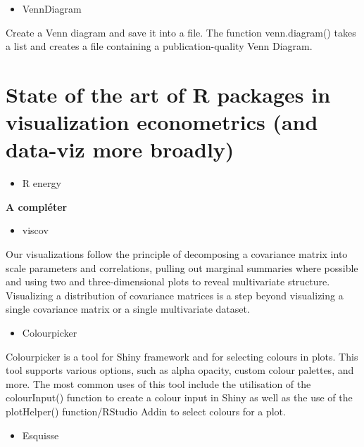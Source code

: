 \documentclass[
]{report}
\providecommand{\tightlist}{%
  \setlength{\itemsep}{0pt}\setlength{\parskip}{0pt}}
\begin{document}
\begin{itemize}
\tightlist
\item
  VennDiagram
\end{itemize}

Create a Venn diagram and save it into a file. The function venn.diagram() takes a list and creates a file containing a publication-quality Venn Diagram.

\hypertarget{state-of-the-art-of-r-packages-in-visualization-econometrics-and-data-viz-more-broadly}{%
\chapter{State of the art of R packages in visualization econometrics (and data-viz more broadly)}\label{state-of-the-art-of-r-packages-in-visualization-econometrics-and-data-viz-more-broadly}}

\begin{itemize}
\tightlist
\item
  R energy
\end{itemize}

\textbf{A compléter}

\begin{itemize}
\tightlist
\item
  viscov
\end{itemize}

Our visualizations follow the principle of decomposing a covariance matrix into scale parameters and correlations, pulling out marginal summaries where possible and using two and three-dimensional plots to reveal multivariate structure. Visualizing a distribution of covariance matrices is a step beyond visualizing a single covariance matrix or a single multivariate dataset.

\begin{itemize}
\tightlist
\item
  Colourpicker
\end{itemize}

Colourpicker is a tool for Shiny framework and for selecting colours in plots. This tool supports various options, such as alpha opacity, custom colour palettes, and more. The most common uses of this tool include the utilisation of the colourInput() function to create a colour input in Shiny as well as the use of the plotHelper() function/RStudio Addin to select colours for a plot.

\begin{itemize}
\tightlist
\item
  Esquisse
\end{itemize}
\end{document}

